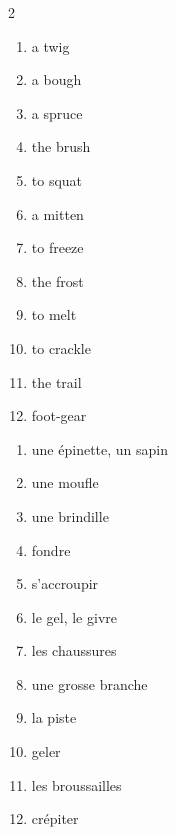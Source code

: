 \documentclass{fiche}
\begin{document}

\begin{multicols}{2}
\begin{enumerate}[label=\arabic*.,itemsep=1.2mm,leftmargin=*]
  \item a twig \hfill {}
  \item a bough \hfill {}
  \item a spruce \hfill {}
  \item the brush \hfill {}
  \item to squat \hfill {}
  \item a mitten \hfill {}
  \item to freeze \hfill {}
  \item the frost \hfill {}
  \item to melt \hfill {}
  \item to crackle \hfill {}
  \item the trail \hfill {}
  \item foot-gear \hfill {}
\end{enumerate}
\columnbreak
\begin{enumerate}[label=\alph*.,itemsep=1.2mm,leftmargin=*]
  \item une épinette, un sapin
  \item une moufle
  \item une brindille
  \item fondre
  \item s'accroupir
  \item le gel, le givre
  \item les chaussures
  \item une grosse branche
  \item la piste
  \item geler
  \item les broussailles
  \item crépiter
\end{enumerate}
\end{multicols}

\end{document}
